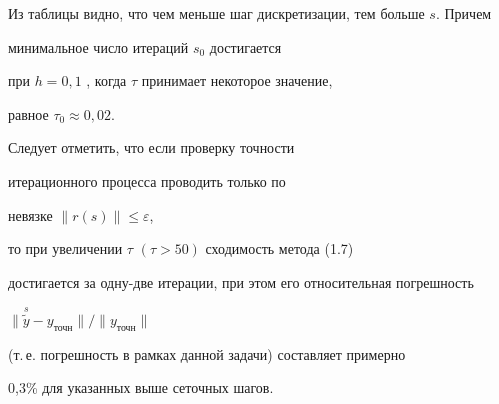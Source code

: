 \medskip





Из таблицы видно, что чем меньше шаг дискретизации, тем больше $s$. Причем 


минимальное число итераций $s_0$ достигается


при $h=0{,}1$ , когда $\tau$ принимает некоторое значение,


равное $\tau_0 \approx 0{,}02$.








Следует отметить, что если проверку точности


итерационного процесса проводить только по


невязке $\|r(s)\|\leq \varepsilon$,


то при увеличении $\tau$ $(\tau>50)$ сходимость метода (1.7)


достигается за одну-две итерации, при этом его относительная погрешность


$\|{\overset{s}{\widetilde y}}-y_{\text{точн}}\|/\|y_{\text{точн}}\|$


(т.\,е. погрешность в рамках данной задачи) составляет примерно


0{,}3\% для указанных выше сеточных шагов.








